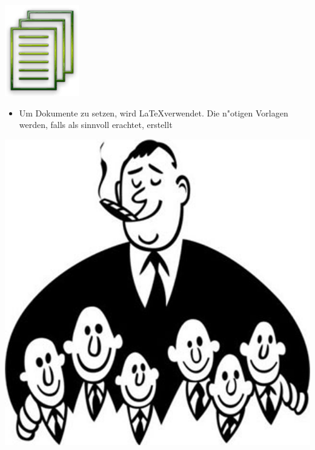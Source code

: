 \documentclass[12pt]{article}
\begin{document}
\begin{center}
\includegraphics[scale=1.2]{doc}\\
\end{center}

\begin{itemize}
\item Um Dokumente zu setzen, wird \LaTeX verwendet. Die n"otigen Vorlagen werden, falls als sinnvoll erachtet, erstellt
\end{itemize}

\begin{center}
\includegraphics[scale=0.12]{boss}\\
\end{center}
\end{document}
